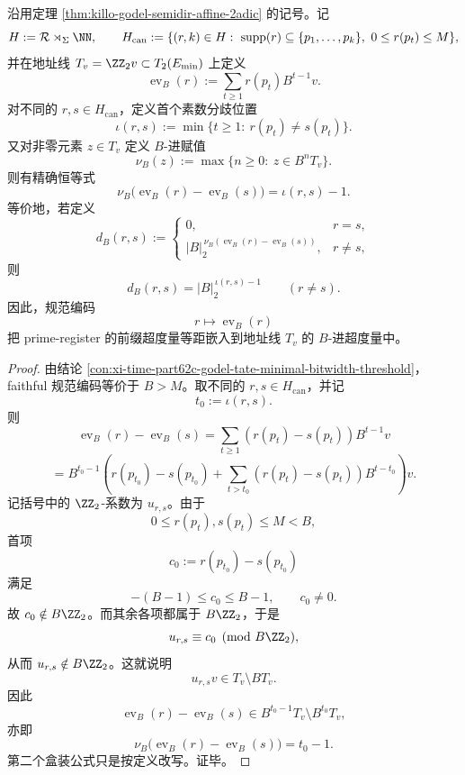 \begin{conclusion}\label{con:xi-time-part62c-godel-tate-prefix-rigidity}
沿用定理 \ref{thm:killo-godel-semidir-affine-2adic} 的记号。记
\[
H:=\mathcal R\rtimes_\Sigma \NN,
\qquad
H_{\mathrm{can}}
:=
\{(r,k)\in H:\ \mathrm{supp}(r)\subseteq\{p_1,\dots,p_k\},\ 0\le r(p_t)\le M\},
\]
并在地址线 \(T_v=\ZZ_2v\subset T_2(E_{\min})\) 上定义
\[
\operatorname{ev}_B(r):=\sum_{t\ge 1}r(p_t)B^{t-1}v.
\]
对不同的 \(r,s\in H_{\mathrm{can}}\)，定义首个素数分歧位置
\[
\iota(r,s):=\min\{t\ge 1:\ r(p_t)\neq s(p_t)\}.
\]
又对非零元素 \(z\in T_v\) 定义 \(B\)-进赋值
\[
\nu_B(z):=\max\{n\ge 0:\ z\in B^nT_v\}.
\]
则有精确恒等式
\[
\boxed{\;
\nu_B\bigl(\operatorname{ev}_B(r)-\operatorname{ev}_B(s)\bigr)
=
\iota(r,s)-1.\;}
\]
等价地，若定义
\[
d_B(r,s):=
\begin{cases}
0,& r=s,\\[2pt]
|B|_2^{\,\nu_B(\operatorname{ev}_B(r)-\operatorname{ev}_B(s))},& r\neq s,
\end{cases}
\]
则
\[
\boxed{\;
d_B(r,s)=|B|_2^{\,\iota(r,s)-1}
\qquad (r\neq s).\;}
\]
因此，规范编码
\[
r\longmapsto \operatorname{ev}_B(r)
\]
把 prime-register 的前缀超度量等距嵌入到地址线 \(T_v\) 的 \(B\)-进超度量中。
\end{conclusion}
\begin{proof}
由结论 \ref{con:xi-time-part62c-godel-tate-minimal-bitwidth-threshold}，faithful 规范编码等价于 \(B>M\)。取不同的 \(r,s\in H_{\mathrm{can}}\)，并记
\[
t_0:=\iota(r,s).
\]
则
\[
\operatorname{ev}_B(r)-\operatorname{ev}_B(s)
=
\sum_{t\ge 1}(r(p_t)-s(p_t))B^{t-1}v
\]
\[
=
B^{t_0-1}
\left(
r(p_{t_0})-s(p_{t_0})
+
\sum_{t>t_0}(r(p_t)-s(p_t))B^{t-t_0}
\right)v.
\]
记括号中的 \(\ZZ_2\)-系数为 \(u_{r,s}\)。由于
\[
0\le r(p_t),s(p_t)\le M<B,
\]
首项
\[
c_0:=r(p_{t_0})-s(p_{t_0})
\]
满足
\[
-(B-1)\le c_0\le B-1,
\qquad
c_0\neq 0.
\]
故 \(c_0\notin B\ZZ_2\)。而其余各项都属于 \(B\ZZ_2\)，于是
\[
u_{r,s}\equiv c_0\pmod{B\ZZ_2},
\]
从而 \(u_{r,s}\notin B\ZZ_2\)。这就说明
\[
u_{r,s}v\in T_v\setminus BT_v.
\]
因此
\[
\operatorname{ev}_B(r)-\operatorname{ev}_B(s)
\in
B^{t_0-1}T_v\setminus B^{t_0}T_v,
\]
亦即
\[
\nu_B\bigl(\operatorname{ev}_B(r)-\operatorname{ev}_B(s)\bigr)=t_0-1.
\]
第二个盒装公式只是按定义改写。证毕。
\end{proof}

